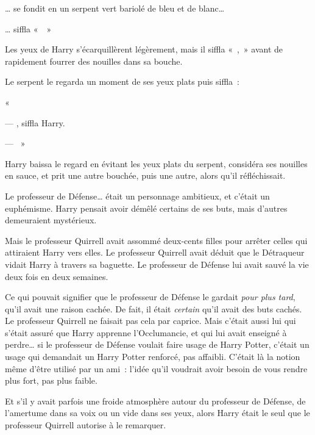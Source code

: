 … se fondit en un serpent vert bariolé de bleu et de blanc…

… siffla «~~»

Les yeux de Harry s'écarquillèrent légèrement, mais il siffla «~,~» avant de rapidement fourrer des nouilles dans sa bouche.

Le serpent le regarda un moment de ses yeux plats puis siffla~:

«~

--- , siffla Harry.

--- ~»

Harry baissa le regard en évitant les yeux plats du serpent, considéra ses nouilles en sauce, et prit une autre bouchée, puis une autre, alors qu'il réfléchissait.

Le professeur de Défense… était un personnage ambitieux, et c'était un euphémisme.
Harry pensait avoir démêlé certains de ses buts, mais d'autres demeuraient mystérieux.

Mais le professeur Quirrell avait assommé deux-cents filles pour arrêter celles qui attiraient Harry vers elles.
Le professeur Quirrell avait déduit que le Détraqueur vidait Harry à travers sa baguette.
Le professeur de Défense lui avait sauvé la vie deux fois en deux semaines.

Ce qui pouvait signifier que le professeur de Défense le gardait \emph{pour plus tard}, qu'il avait une raison cachée.
De fait, il était \emph{certain} qu'il avait des buts cachés.
Le professeur Quirrell ne faisait pas cela par caprice.
Mais c'était aussi lui qui s'était assuré que Harry apprenne l'Occlumancie, et qui lui avait enseigné à perdre… si le professeur de Défense voulait faire usage de Harry Potter, c'était un usage qui demandait un Harry Potter renforcé, pas affaibli.
C'était là la notion même d'être utilisé par un ami~: l'idée qu'il voudrait avoir besoin de vous rendre plus fort, pas plus faible.

Et s'il y avait parfois une froide atmosphère autour du professeur de Défense, de l'amertume dans sa voix ou un vide dans ses yeux, alors Harry était le seul que le professeur Quirrell autorise à le remarquer.

